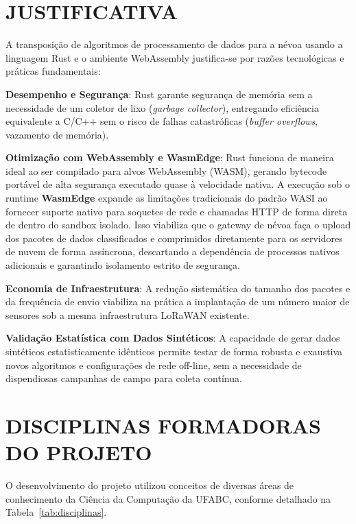 \documentclass[
	12pt,
	openright,
	oneside,
	a4paper,
	english,
	brazil
	]{abntex2}
\begin{document}
\section{JUSTIFICATIVA}

A transposição de algoritmos de processamento de dados para a névoa usando a linguagem Rust e o ambiente WebAssembly justifica-se por razões tecnológicas e práticas fundamentais:

\textbf{Desempenho e Segurança}: Rust garante segurança de memória sem a necessidade de um coletor de lixo (\textit{garbage collector}), entregando eficiência equivalente a C/C++ sem o risco de falhas catastróficas (\textit{buffer overflows}, vazamento de memória).

\textbf{Otimização com WebAssembly e WasmEdge}: Rust funciona de maneira ideal ao ser compilado para alvos WebAssembly (WASM), gerando bytecode portável de alta segurança executado quase à velocidade nativa. A execução sob o runtime \textbf{WasmEdge} expande as limitações tradicionais do padrão WASI ao fornecer suporte nativo para soquetes de rede e chamadas HTTP de forma direta de dentro do sandbox isolado. Isso viabiliza que o gateway de névoa faça o upload dos pacotes de dados classificados e comprimidos diretamente para os servidores de nuvem de forma assíncrona, descartando a dependência de processos nativos adicionais e garantindo isolamento estrito de segurança.

\textbf{Economia de Infraestrutura}: A redução sistemática do tamanho dos pacotes e da frequência de envio viabiliza na prática a implantação de um número maior de sensores sob a mesma infraestrutura LoRaWAN existente.

\textbf{Validação Estatística com Dados Sintéticos}: A capacidade de gerar dados sintéticos estatisticamente idênticos permite testar de forma robusta e exaustiva novos algoritmos e configurações de rede off-line, sem a necessidade de dispendiosas campanhas de campo para coleta contínua.

\section{DISCIPLINAS FORMADORAS DO PROJETO}

O desenvolvimento do projeto utilizou conceitos de diversas áreas de conhecimento da Ciência da Computação da UFABC, conforme detalhado na Tabela~\ref{tab:disciplinas}.
\end{document}
